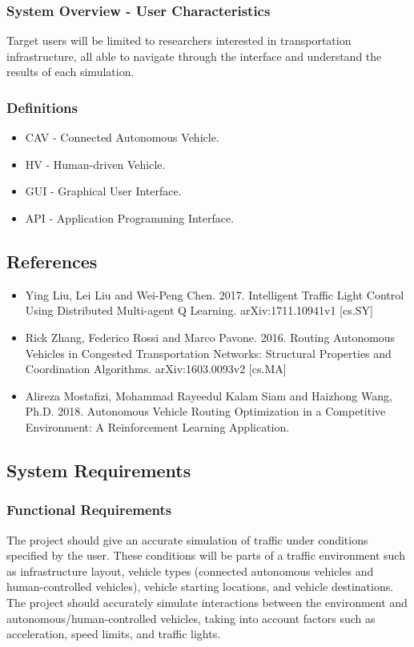 \documentclass[onecolumn, draftclsnofoot,10pt, compsoc]{IEEEtran}
\begin{document}
\subsubsection{System Overview - User Characteristics}
Target users will be limited to researchers interested in transportation infrastructure, all able to navigate through the interface and understand the results of each simulation.
\subsubsection{Definitions}
\begin{itemize}
\item CAV - Connected Autonomous Vehicle.
\item HV - Human-driven Vehicle.
\item GUI - Graphical User Interface.
\item API - Application Programming Interface.
\end{itemize}
\subsection{References}
\begin{itemize}
\item Ying Liu, Lei Liu and Wei-Peng Chen. 2017. Intelligent Traffic Light Control Using Distributed Multi-agent Q Learning. arXiv:1711.10941v1 [cs.SY]
\item Rick Zhang, Federico Rossi and Marco Pavone. 2016. Routing Autonomous Vehicles in Congested Transportation Networks: Structural Properties and Coordination Algorithms. arXiv:1603.0093v2 [cs.MA]
\item Alireza Mostafizi, Mohammad Rayeedul Kalam Siam and Haizhong Wang, Ph.D. 2018.  Autonomous Vehicle Routing Optimization in a Competitive Environment: A Reinforcement Learning Application.
\end{itemize}
\subsection{System Requirements}
\subsubsection{Functional Requirements}
The project should give an accurate simulation of traffic under conditions specified by the user.
These conditions will be parts of a traffic environment such as infrastructure layout, vehicle types (connected autonomous vehicles and human-controlled vehicles), vehicle starting locations, and vehicle destinations.
The project should accurately simulate interactions between the environment and autonomous/human-controlled vehicles, taking into account factors such as acceleration, speed limits, and traffic lights.
\end{document}
